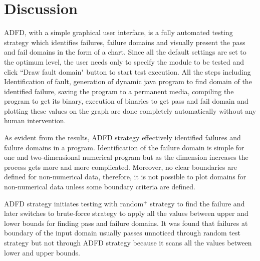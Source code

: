 



\section{Discussion} \label{sec:discussion4}

ADFD, with a simple graphical user interface, is a fully automated testing strategy which identifies failures, failure domains and visually present the pass and fail domains in the form of a chart. Since all the default settings are set to the optimum level, the user needs only to specify the module to be tested and click ``Draw fault domain" button to start test execution. All the steps including Identification of fault, generation of dynamic java program to find domain of the identified failure, saving the program to a permanent media, compiling the program to get its binary, execution of binaries to get pass and fail domain and plotting these values on the graph are done completely automatically without any human intervention.

As evident from the results, ADFD strategy effectively identified failures and failure domains in a program. Identification of the failure domain is simple for one and two-dimensional numerical program but as the dimension increases the process gets more and more complicated. Moreover, no clear boundaries are defined for non-numerical data, therefore, it is not possible to plot domains for non-numerical data unless some boundary criteria are defined.

ADFD strategy initiates testing with random$^+$ strategy to find the failure and later switches to brute-force strategy to apply all the values between upper and lower bounds for finding pass and failure domains. It was found that failures at boundary of the input domain usually passes unnoticed through random test strategy but not through ADFD strategy because it scans all the values between lower and upper bounds.



